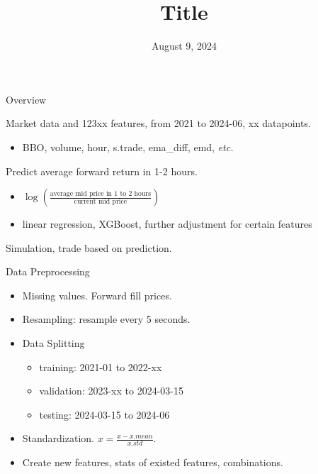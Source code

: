 \documentclass[10pt]{beamer}
\title[]{Title} %
\author{}
\date{August 9, 2024}
\begin{document}
\frame{\titlepage}






\begin{frame}{Overview}


Market data and 123xx features, from 2021 to 2024-06, xx datapoints.
\begin{itemize}
    \item BBO, volume, hour, s.trade, ema\_diff, emd, \emph{etc.}
\end{itemize}
\pause
Predict average forward return in 1-2 hours.
\begin{itemize}
    \item $\log\left(\frac{\text{average mid price in 1 to 2 hours}}{\text{current mid price}}\right)$
\pause
    \item linear regression, XGBoost, further adjustment for certain features
\end{itemize}
\pause
Simulation, trade based on prediction.




\end{frame}


\begin{frame}{Data Preprocessing}

\begin{itemize}
    \item Missing values. Forward fill prices.
\pause
    \item Resampling: resample every 5 seconds.
\pause
    \item Data Splitting
    \begin{itemize}
        \item training: 2021-01 to 2022-xx
        \item validation: 2023-xx to 2024-03-15
        \item testing: 2024-03-15 to 2024-06
    \end{itemize}
\pause
    \item Standardization. $x=\frac{x-x.mean}{x.std}$.
\pause
    \item Create new features, stats of existed features, combinations.
\end{itemize}


\end{frame}
\end{document}
